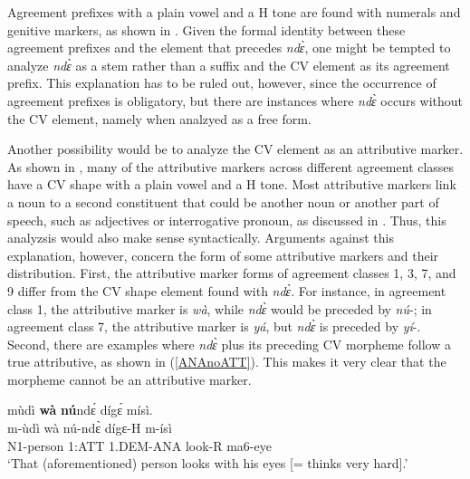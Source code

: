 Agreement prefixes with a plain vowel and a H tone are found with numerals and genitive markers, as shown in . Given the formal identity between these agreement prefixes and the element that precedes {\itshape ndɛ̀}, one might be tempted to analyze {\itshape ndɛ̀} as a stem rather than a suffix and the CV element as its agreement prefix.  This explanation has to be ruled out, however, since the occurrence of agreement prefixes is obligatory, but there are instances where {\itshape ndɛ̀} occurs without the CV element, namely when analzyed as a free form.

Another possibility would be to analyze the CV element as an attributive marker. As shown in , many of the attributive markers across different agreement classes have  a CV shape with a plain vowel and a H tone. Most attributive markers link a noun to a second constituent that could be another noun or another part of speech, such as adjectives or interrogative pronoun, as discussed in . Thus, this analyzsis would also make sense syntactically. Arguments against this explanation, however, concern the form of some attributive markers and their distribution. First, the attributive marker forms of agreement classes 1, 3, 7, and 9 differ from the CV shape element found with {\itshape ndɛ̀}. For instance, in agreement class 1, the attributive marker is {\itshape wà}, while {\itshape ndɛ̀} would be preceded by {\itshape nú}-; in agreement class 7, the attributive marker is {\itshape yá}, but {\itshape ndɛ̀} is preceded by {\itshape yí}-. Second, there are examples where {\itshape ndɛ̀} plus its preceding CV morpheme follow a true attributive, as shown in (\ref{ANAnoATT}). This makes it very clear that the morpheme cannot be an attributive marker.

\begin{exe} 
\ex\label{ANAnoATT} 
  \glll mùdì {\bfseries wà} {\bfseries nú}ndɛ́ dígɛ́ mísì. \\
       m-ùdì wà nú-ndɛ̀ dígɛ-H m-ísì \\
        N1-person 1:ATT 1.DEM-ANA look-R ma6-eye \\
    \trans `That (aforementioned) person looks with his eyes [= thinks very hard].'
\end{exe}

